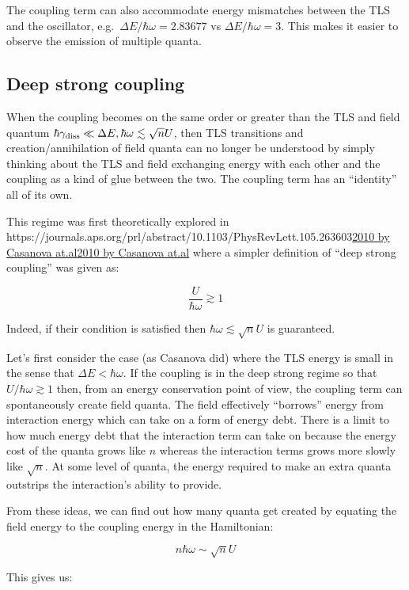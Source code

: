 \documentclass[
]{article}
\let\oldhref\href
\renewcommand{\href}[2]{\ifx#1\urlprefix\oldhref{#1}{#2}\else\uline{\oldhref{#1}{#2}}\fi}
\renewcommand{\[}{\begin{equation}}
\renewcommand{\]}{\end{equation}}
\begin{document}
The coupling term can also accommodate energy mismatches between the TLS
and the oscillator, e.g.~\(\Delta E/ \hbar\omega = 2.83677\) vs
\(\Delta E/ \hbar\omega = 3\). This makes it easier to observe the
emission of multiple quanta.

\subsection{Deep strong coupling}\label{deep-strong-coupling-1}

When the coupling becomes on the same order or greater than the TLS and
field quantum
\(\hbar\gamma_{\rm diss} \ll \Delta E , \hbar \omega \lesssim \sqrt{n}U\),
then TLS transitions and creation/annihilation of field quanta can no
longer be understood by simply thinking about the TLS and field
exchanging energy with each other and the coupling as a kind of glue
between the two. The coupling term has an ``identity'' all of its own.

This regime was first theoretically explored in
\href{https://journals.aps.org/prl/abstract/10.1103/PhysRevLett.105.263603}{2010
by Casanova at.al} where a simpler definition of ``deep strong
coupling'' was given as:

\[
\frac{U}{\hbar\omega} \gtrsim 1
\label{eq:deepstrongcoupling}
\]

Indeed, if their condition is satisfied then
\(\hbar \omega \lesssim \sqrt{n}U\) is guaranteed.

Let's first consider the case (as Casanova did) where the TLS energy is
small in the sense that \(\Delta E < \hbar \omega\). If the coupling is
in the deep strong regime so that \(U/\hbar\omega \gtrsim 1\) then, from
an energy conservation point of view, the coupling term can
spontaneously create field quanta. The field effectively ``borrows''
energy from interaction energy which can take on a form of energy debt.
There is a limit to how much energy debt that the interaction term can
take on because the energy cost of the quanta grows like \(n\) whereas
the interaction terms grows more slowly like \(\sqrt{n}\). At some level
of quanta, the energy required to make an extra quanta outstrips the
interaction's ability to provide.

From these ideas, we can find out how many quanta get created by
equating the field energy to the coupling energy in the Hamiltonian:

\[
n\hbar\omega \sim \sqrt{n}U
\label{eq:couplingbalancefield}
\]

This gives us:
\end{document}
